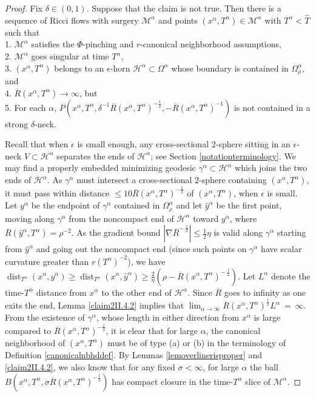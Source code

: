 \documentclass[12pt]{amsart}
\newcommand{\al}{\alpha}
\newcommand{\dist}{\operatorname{dist}}
\newcommand{\h}{{\mathcal H}}
\newcommand{\M}{{\mathcal M}}
\newcommand{\Om}{\Omega}
\newcommand{\de}{\delta}
\newcommand{\eps}{\epsilon}
\newcommand{\ga}{\gamma}
\numberwithin{equation}{section}
\theoremstyle{plain}
\theoremstyle{definition}
\theoremstyle{remark}
\begin{document}
\begin{proof}
Fix $\delta \in (0,1)$. Suppose that the claim is not true.
Then there is a sequence of
Ricci flows with surgery $\M^\al$  and points $(x^\alpha, T^\alpha) \in
\M^\al$ with $T^\alpha < \widehat{T}$ such that \\
1. $\M^\al$ satisfies 
the $\Phi$-pinching
and $r$-canonical neighborhood assumptions, \\
2. $\M^\al$ goes singular at time $T^\al$,\\
3. $(x^\al,T^\al)$ belongs to an $\eps$-horn $\h^\al\subset \Omega^\alpha$
whose boundary is contained in $\Om_\rho^\al$, and \\
4. $\overline{R}(x^\al,T^\al) \rightarrow \infty$, but \\
5. For each $\alpha$,
 $P(x^\al,T^\al,\de^{-1}\overline{R}(x^\al,T^\al)^{-\frac12},
 -\overline{R}(x^\al,T^\al)^{-1})$
is not contained in a strong $\delta$-neck.  

Recall that when $\eps$ is small enough, any cross-sectional $2$-sphere
sitting in an $\eps$-neck $V\subset \h^\al$ 
separates the ends of $\h^\al$;
see Section \ref{notationterminology}.  We may
find a properly embedded minimizing geodesic $\ga^\al\subset \h^\al$ 
which joins the two
ends of $\h^\al$.   As $\ga^\al$ must intersect a cross-sectional
$2$-sphere containing $(x^\al,T^\al)$, it must pass within distance 
$\leq 10\overline{R}(x^\al,T^\al)^{-\frac12}$ of $(x^\al,T^\al)$,
when $\eps$ is small.  
Let $y^\al$ be the endpoint of $\gamma^\al$ contained in
$\Omega^\al_\rho$ and let $\widehat{y}^\al$ be the first point,
moving along $\gamma^\al$ from the noncompact end of $\h^\al$
toward $y^\al$,  
where $\overline{R}(\widehat{y}^\al, T^\al) = \rho^{-2}$. As the gradient bound
$|\nabla \overline{R}^{- \: \frac12}| \le \frac12 \eta$ is valid along
$\gamma^\al$ starting from $\widehat{y}^\al$ and going out the noncompact end
(since such points on $\ga^\al$ have scalar curvature greater than
$r(T^\al)^{-2}$), we have $\dist_{T^\al}(x^\al, y^\al) \ge 
\dist_{T^\al}(x^\al, \widehat{y}^\al) \ge \frac{2}{\eta}
\left(\rho - \overline{R}(x^\al, T^\al)^{- \: \frac12} \right)$.
Let $L^\al$ denote the time-$T^\al$ distance from $x^\al$ to the other
end of $\h^\al$. Since $\overline{R}$ goes to infinity as one exits the end,
Lemma \ref{claim2II.4.2} implies that $\lim_{\al \rightarrow \infty}
\overline{R}(x^\al, T^\al)^{\frac12} L^\al \: = \: \infty$.
From the existence of $\ga^\al$, whose length in either direction from
$x^\al$ is large compared to $\overline{R}(x^\al, T^\al)^{-\frac12}$,
it is clear that for large $\al$,
the canonical neighborhood of $(x^\al, T^\al)$ must be
of type (a) or (b) in the terminology of Definition \ref{canonicalnbhddef}. 
By Lemmas \ref{lemoverlinerisproper} and \ref{claim2II.4.2},
we also know that for any fixed $\sigma < \infty$, for large
$\al$ the ball $B(x^\al, T^\al, \sigma \overline{R}(x^\al, T^\al)^{-\frac12})$
has compact closure in the time-$T^\al$ slice of $\M^\al$.
 

\end{proof}
\end{document}

